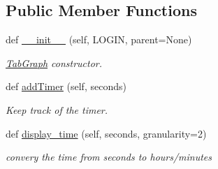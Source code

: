 \subsection*{Public Member Functions}
\begin{DoxyCompactItemize}
\item 
def \mbox{\hyperlink{classboil_mash_monitor_1_1_tab_graph_a59c4db388a7c573bac6d61f867fa80de}{\+\_\+\+\_\+init\+\_\+\+\_\+}} (self, L\+O\+G\+IN, parent=None)
\begin{DoxyCompactList}\small\item\em \mbox{\hyperlink{classboil_mash_monitor_1_1_tab_graph}{Tab\+Graph}} constructor. \end{DoxyCompactList}\item 
\mbox{\label{classboil_mash_monitor_1_1_tab_graph_a1b51a196e9420ae58795741f33a9db56}} 
def \mbox{\hyperlink{classboil_mash_monitor_1_1_tab_graph_a1b51a196e9420ae58795741f33a9db56}{add\+Timer}} (self, seconds)
\begin{DoxyCompactList}\small\item\em Keep track of the timer. \end{DoxyCompactList}\item 
\mbox{\label{classboil_mash_monitor_1_1_tab_graph_a1bcdc0635e82a7217bac0442e6746dc2}} 
def \mbox{\hyperlink{classboil_mash_monitor_1_1_tab_graph_a1bcdc0635e82a7217bac0442e6746dc2}{display\+\_\+time}} (self, seconds, granularity=2)
\begin{DoxyCompactList}\small\item\em convery the time from seconds to hours/minutes \end{DoxyCompactList}\end{DoxyCompactItemize}
